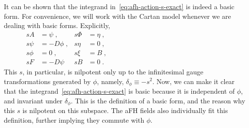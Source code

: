 \documentclass[../main.tex]{subfiles}
\begin{document}
It can be shown that the integrand in~\eqref{eq:afh-action-s-exact} is indeed a basic form. For convenience, we will work with the Cartan model whenever we are dealing with basic forms. Explicitly,
\begin{subequations}%
  \label{eq:cartan-model-afh-brst}
  \begin{align}
    s A    & =   \psi \;,   & s \Phi & =   \eta \;, & \hspace{200pt} \\
    s \psi & =  - D\phi \;, & s \eta & = 0 \;,      & \hspace{200pt} \\
    s \phi & = 0 \;,        & s \xi  & =  B  \;,    & \hspace{200pt} \\
    s F    & = -D\psi       & s B    & = 0      \;. & \hspace{200pt}
  \end{align}
\end{subequations}
This $s$, in particular, is nilpotent only up to the infinitesimal gauge transformations generated by $\phi$, namely, $\delta_{\phi} \equiv - s^2$. Now, we can make it clear that the integrand~\eqref{eq:afh-action-s-exact} is basic because it is independent of $\phi$, and invariant under $\delta_{\phi}$. This is the definition of a basic form, and the reason why this $s$ is nilpotent on this subspace. The aFH fields also individually fit this definition, further implying they commute with $\phi$.
\end{document}
